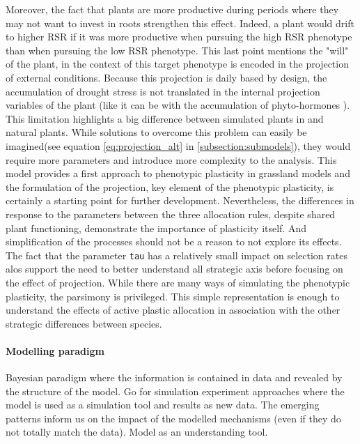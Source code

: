 Moreover, the fact that plants are more productive during periods where they may not want to invest in roots strengthen this effect. Indeed, a plant would drift to higher RSR if it was more productive when pursuing the high RSR phenotype than when pursuing the low RSR phenotype. This last point mentions the "will" of the plant, in the context of \model this target phenotype is encoded in the projection of external conditions. Because this projection is daily based by design, the accumulation of drought stress is not translated in the internal projection variables of the plant (like it can be with the accumulation of phyto-hormones \cite{need ref}). This limitation highlights a big difference between simulated plants in \model and natural plants. While solutions to overcome this problem can easily be imagined(see equation \ref{eq:projection_alt} in \ref{subsection:submodels}), they would require more parameters and introduce more complexity to the analysis. This model provides a first approach to phenotypic plasticity in grassland models and the formulation of the projection, key element of the phenotypic plasticity, is certainly a starting point for further development. Nevertheless, the differences in response to the parameters between the three allocation rules, despite shared plant functioning, demonstrate the importance of plasticity itself. And simplification of the processes should not be a reason to not explore its effects. The fact that the parameter \texttt{tau} has a relatively small impact on selection rates alos support the need to better understand all strategic axis before focusing on the effect of projection. While there are many ways of simulating the phenotypic plasticity, the parsimony is privileged. This simple representation is enough to understand the effects of active plastic allocation in association with the other strategic differences between species.



\paragraph{Modelling paradigm}
Bayesian paradigm where the information is contained in data and revealed by the structure of the model. Go for simulation experiment approaches where the model is used as a simulation tool and results as new data. The emerging patterns inform us on the impact of the modelled mechanisms (even if they do not totally match the data). Model as an understanding tool.\\


